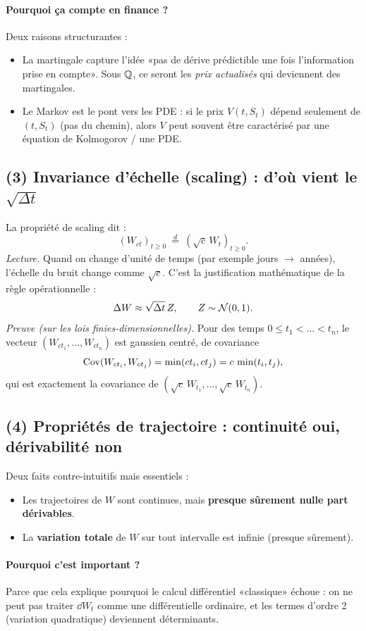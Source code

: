 \paragraph{Pourquoi ça compte en finance ?}
Deux raisons structurantes :
\begin{itemize}[leftmargin=*]
\item La martingale capture l'idée «pas de dérive prédictible une fois l'information prise en compte». Sous $\mathbb{Q}$, ce seront les \emph{prix actualisés} qui deviennent des martingales.
\item Le Markov est le pont vers les PDE : si le prix $V(t,S_t)$ dépend seulement de $(t,S_t)$ (pas du chemin), alors $V$ peut souvent être caractérisé par une équation de Kolmogorov / une PDE.
\end{itemize}

\subsection*{(3) Invariance d'échelle (scaling) : d'où vient le $\sqrt{\Delta t}$}
La propriété de scaling dit :
\[
(W_{ct})_{t\ge 0}\ \overset{d}{=}\ (\sqrt{c}\,W_t)_{t\ge 0}.
\]
\emph{Lecture.} Quand on change d'unité de temps (par exemple jours $\to$ années), l'échelle du bruit change comme $\sqrt{c}$.
C'est la justification mathématique de la règle opérationnelle :
\[
\Delta W \approx \sqrt{\Delta t}\,Z,\qquad Z\sim\mathcal{N}(0,1).
\]
\emph{Preuve (sur les lois finies-dimensionnelles).} Pour des temps $0\le t_1<\dots<t_n$, le vecteur $(W_{ct_1},\dots,W_{ct_n})$ est gaussien centré, de covariance
\[
\mathrm{Cov}(W_{ct_i},W_{ct_j})=\min(ct_i,ct_j)=c\,\min(t_i,t_j),
\]
qui est exactement la covariance de $(\sqrt{c}\,W_{t_1},\dots,\sqrt{c}\,W_{t_n})$.

\subsection*{(4) Propriétés de trajectoire : continuité oui, dérivabilité non}
Deux faits contre-intuitifs mais essentiels :
\begin{itemize}[leftmargin=*]
\item Les trajectoires de $W$ sont continues, mais \textbf{presque sûrement nulle part dérivables}.
\item La \textbf{variation totale} de $W$ sur tout intervalle est infinie (presque sûrement).
\end{itemize}
\paragraph{Pourquoi c'est important ?}
Parce que cela explique pourquoi le calcul différentiel «classique» échoue : on ne peut pas traiter $\dd W_t$ comme une différentielle ordinaire, et les termes d'ordre 2 (variation quadratique) deviennent déterminants.

